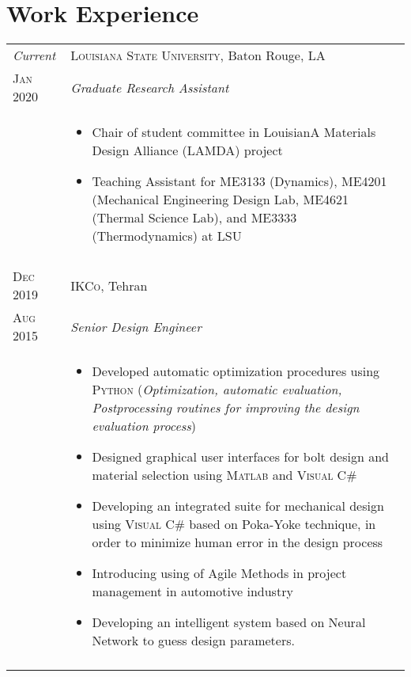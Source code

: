 \documentclass[a4paper,9pt]{article}
\begin{document}
\section{Work Experience}
\begin{longtable}{p{1.7cm}|p{13.3cm}}
\emph{Current} & \textsc{Louisiana State University}, Baton Rouge, LA \\
 \textsc{Jan 2020} & \emph{Graduate Research Assistant}\\
  &
  \begin{itemize}[leftmargin=*]
 
 \item{\footnotesize{Chair of student committee in LouisianA Materials Design Alliance (LAMDA) project}}
 
 \item{\footnotesize{Teaching Assistant for ME3133 (Dynamics), ME4201 (Mechanical Engineering Design Lab, ME4621 (Thermal Science Lab), and ME3333 (Thermodynamics) at LSU}}
 
  \end{itemize}\\
  
 \multicolumn{2}{c}{}\\
 \textsc{Dec 2019} & \textsc{IKCo}, Tehran \\
 \textsc{Aug 2015} & \emph{Senior Design Engineer}\\
 &
 \begin{itemize}[leftmargin=*]
 
 
 \item{\footnotesize{Developed automatic optimization procedures using \textsc{Python} (\textit{Optimization, automatic evaluation, Postprocessing routines for improving the design evaluation process})}}
 
 \item{\footnotesize{Designed graphical user interfaces for bolt design and material selection using \textsc{Matlab} and \textsc{Visual C\#}}}
 
 \item{\footnotesize{Developing an integrated suite for mechanical design using \textsc{Visual C\#} based on Poka-Yoke technique, in order to minimize human error in the design process}}
 
 \item{\footnotesize{Introducing using of Agile Methods in project management in automotive industry}}
 
 \item{\footnotesize{Developing an intelligent system based on Neural Network to guess design parameters.}}
 \end{itemize}\\
 \multicolumn{2}{c}{}\\
 

\end{longtable}
\end{document}
